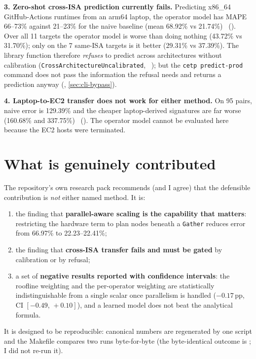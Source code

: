 \begin{warnbox}
\textbf{3. Zero-shot cross-ISA prediction currently fails.} Predicting x86\_64 GitHub-Actions runtimes
from an arm64 laptop, the operator model has MAPE 66--73\% against 21--23\% for the naive baseline
(mean 68.92\% vs 21.74\%) \evFILE\ (). Over all 11 targets
the operator model is worse than doing nothing (43.72\% vs 31.70\%); only on the 7 same-ISA targets is it
better (29.31\% vs 37.39\%). The library function therefore \emph{refuses} to predict across architectures without
calibration (\texttt{CrossArchitectureUncalibrated}, \evCODE\ ); but the
\texttt{cetp predict-prod} command does not pass the information the refusal needs and returns a
prediction anyway (\evRUN, \cref{sec:cli-bypass}).
\end{warnbox}

\begin{warnbox}
\textbf{4. Laptop-to-EC2 transfer does not work for either method.} On 95 pairs, naive error is 129.39\%
and the cheaper laptop-derived signatures are far worse (160.68\% and 337.75\%)
\evFILE\ (). The operator model cannot be evaluated here because the
EC2 hosts were terminated.
\end{warnbox}

\section{What is genuinely contributed}
The repository's own research pack recommends (and I agree) that the defensible contribution is
\emph{not} either named method. It is:
\begin{enumerate}
\item the finding that \textbf{parallel-aware scaling is the capability that matters}: restricting the
  hardware term to plan nodes beneath a \texttt{Gather} reduces error from 66.97\% to 22.23--22.41\%;
\item the finding that \textbf{cross-ISA transfer fails and must be gated} by calibration or by refusal;
\item a set of \textbf{negative results reported with confidence intervals}: the roofline weighting and
  the per-operator weighting are statistically indistinguishable from a single scalar once parallelism is
  handled ($-0.17$\,pp, CI $[-0.49,\,+0.10]$), and a learned model does not beat the analytical formula.
\end{enumerate}
It is designed to be reproducible: canonical numbers are regenerated by one script and the Makefile compares two runs byte-for-byte (the byte-identical outcome is \evPACK; I did not re-run it).

